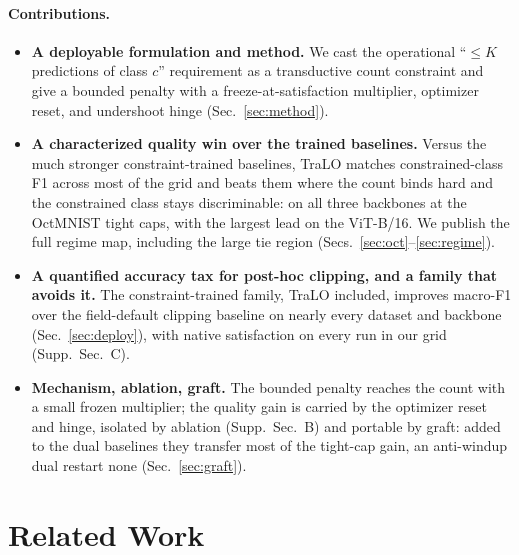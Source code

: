 \documentclass[letterpaper]{article} %
\begin{document}
\paragraph{Contributions.}
\begin{itemize}\itemsep2pt
  \item \textbf{A deployable formulation and method.} We cast the operational
  ``$\le K$ predictions of class $c$'' requirement as a transductive count constraint
  and give a bounded penalty with a freeze-at-satisfaction multiplier,
  optimizer reset, and undershoot hinge (Sec.~\ref{sec:method}).
  \item \textbf{A characterized quality win over the trained baselines.}
  Versus the much stronger constraint-trained baselines, TraLO matches
  constrained-class F1 across most of the grid and beats them where the count
  binds hard and the constrained class stays discriminable: on all three backbones
  at the OctMNIST tight caps, with the largest lead on the ViT-B/16. We publish the
  full regime map, including the large
  tie region (Secs.~\ref{sec:oct}--\ref{sec:regime}).
  \item \textbf{A quantified accuracy tax for post-hoc clipping, and a family that
  avoids it.} The constraint-trained family, TraLO included, improves macro-F1 over the
  field-default clipping baseline on nearly every dataset and backbone
  (Sec.~\ref{sec:deploy}), with native satisfaction on every run in our grid
  (Supp.~Sec.~C).
  \item \textbf{Mechanism, ablation, graft.} The bounded penalty reaches the count with
  a small frozen multiplier; the quality gain is carried by the optimizer reset and
  hinge, isolated by ablation (Supp.~Sec.~B) and portable by graft: added to the dual
  baselines they transfer most of the tight-cap gain, an anti-windup dual restart none
  (Sec.~\ref{sec:graft}).
\end{itemize}

\section{Related Work}
\end{document}
